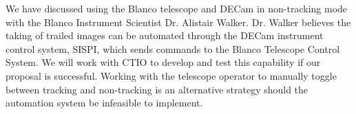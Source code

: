 \documentclass[11pt]{article}
\begin{document}



%
%




\specialrequest

We have discussed using the Blanco telescope and DECam in non-tracking mode with the Blanco Instrument Scientist Dr. Alistair Walker. Dr. Walker believes the taking of trailed images can be automated through the DECam instrument control system, SISPI, which sends commands to the Blanco Telescope Control System. We will work with CTIO to develop and test this capability if our proposal is successful. Working with the telescope operator to manually toggle between tracking and non-tracking is an alternative strategy should the automation system be infeasible to implement.

\end{document}
